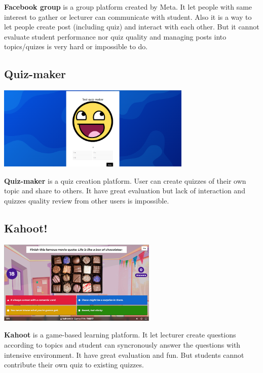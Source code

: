 \documentclass[a4paper, 12pt]{report}
\begin{document}
    \textbf{Facebook group} is a group platform created by Meta. It let people with same interest to gather or lecturer can communicate with student. Also it is a way to let people create post (including quiz) and interact with each other. But it cannot evaluate student performance nor quiz quality and managing posts into topics/quizes is very hard or impossible to do.

    \subsection*{Quiz-maker}
    \begin{center}
        \includegraphics[height=150px]{quiz-maker.png}
    \end{center}
    
    \textbf{Quiz-maker} is a quiz creation platform. User can create quizzes of their own topic and share to others. It have great evaluation but lack of interaction and quizzes quality review from other users is impossible.
    
    
    \subsection*{Kahoot!}
    \begin{center}
        \includegraphics[height=150px]{kahoot.png}
    \end{center}
    
    \textbf{Kahoot} is a game-based learning platform. It let lecturer create questions according to topics and student can syncronously answer the questions with intensive environment. It have great evaluation and fun. But students cannot contribute their own quiz to existing quizzes.
\end{document}
